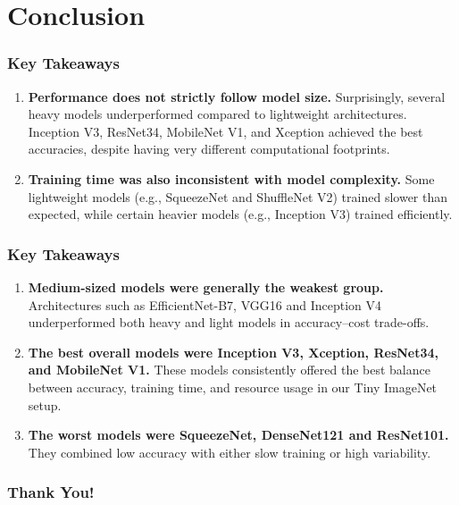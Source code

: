 \documentclass{beamer}
\begin{document}
\section{Conclusion}

\begin{frame}
    \frametitle{Key Takeaways}
    \begin{enumerate}
        \item \textbf{Performance does not strictly follow model size.}  
              Surprisingly, several heavy models underperformed compared to lightweight architectures.  
              Inception V3, ResNet34, MobileNet V1, and Xception achieved the best accuracies, despite having very different computational footprints.

        \item \textbf{Training time was also inconsistent with model complexity.}  
              Some lightweight models (e.g., SqueezeNet and ShuffleNet V2) trained slower than expected,  
              while certain heavier models (e.g., Inception V3) trained efficiently.
    \end{enumerate}
\end{frame}

\begin{frame}
    \frametitle{Key Takeaways}
    \begin{enumerate}
        \item \textbf{Medium-sized models were generally the weakest group.}  
              Architectures such as EfficientNet-B7, VGG16 and Inception V4 underperformed  
              both heavy and light models in accuracy–cost trade-offs.

        \item \textbf{The best overall models were Inception V3, Xception, ResNet34, and MobileNet V1.}  
              These models consistently offered the best balance between accuracy, training time,  
              and resource usage in our Tiny ImageNet setup.

        \item \textbf{The worst models were SqueezeNet, DenseNet121 and ResNet101.}  
              They combined low accuracy with either slow training or high variability.
    \end{enumerate}
\end{frame}

\begin{frame}
  \frametitle{Thank You!}
  \InfContacts
\end{frame}
\end{document}

